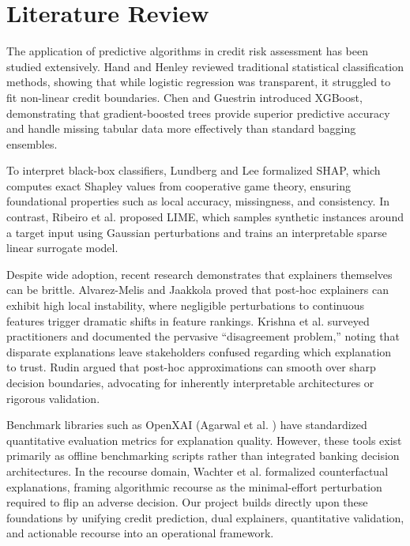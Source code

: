 \documentclass[conference]{IEEEtran}
\begin{document}
\section{Literature Review}
The application of predictive algorithms in credit risk assessment has been studied extensively. Hand and Henley \cite{hand1997} reviewed traditional statistical classification methods, showing that while logistic regression was transparent, it struggled to fit non-linear credit boundaries. Chen and Guestrin \cite{chen2016} introduced XGBoost, demonstrating that gradient-boosted trees provide superior predictive accuracy and handle missing tabular data more effectively than standard bagging ensembles.

To interpret black-box classifiers, Lundberg and Lee \cite{lundberg2017} formalized SHAP, which computes exact Shapley values from cooperative game theory, ensuring foundational properties such as local accuracy, missingness, and consistency. In contrast, Ribeiro et al. \cite{ribeiro2016} proposed LIME, which samples synthetic instances around a target input using Gaussian perturbations and trains an interpretable sparse linear surrogate model.

Despite wide adoption, recent research demonstrates that explainers themselves can be brittle. Alvarez-Melis and Jaakkola \cite{alvarez2018} proved that post-hoc explainers can exhibit high local instability, where negligible perturbations to continuous features trigger dramatic shifts in feature rankings. Krishna et al. \cite{krishna2022} surveyed practitioners and documented the pervasive ``disagreement problem,'' noting that disparate explanations leave stakeholders confused regarding which explanation to trust. Rudin \cite{rudin2019} argued that post-hoc approximations can smooth over sharp decision boundaries, advocating for inherently interpretable architectures or rigorous validation.

Benchmark libraries such as OpenXAI (Agarwal et al. \cite{agarwal2022}) have standardized quantitative evaluation metrics for explanation quality. However, these tools exist primarily as offline benchmarking scripts rather than integrated banking decision architectures. In the recourse domain, Wachter et al. \cite{wachter2017} formalized counterfactual explanations, framing algorithmic recourse as the minimal-effort perturbation required to flip an adverse decision. Our project builds directly upon these foundations by unifying credit prediction, dual explainers, quantitative validation, and actionable recourse into an operational framework.
\end{document}
